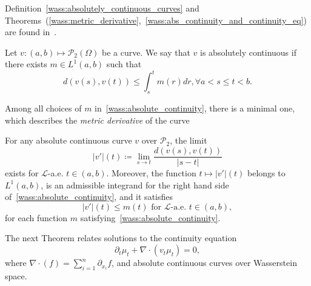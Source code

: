 Definition~\eqref{wass:absolutely_continuous_curves} 
and Theorems~(\ref{wass:metric_derivative},~\ref{wass:abs_continuity_and_continuity_eq}) are found in~\cite{ambrosio2005gradient}. 

\begin{definition}\label{wass:absolutely_continuous_curves}
    Let $v : (a,b) \mapsto \mathcal{P}_2(\Omega)$ be a curve.
    We say that $v$ is absolutely continuous if there exists
    $m \in L^1(a,b)$ such that
    \begin{equation}\label{wass:absolute_continuity}
        d(v(s), v(t)) \leq \int_s^t m(r) dr, \forall a < s \leq t < b.
    \end{equation}
\end{definition}

Among all choices of $m$ in~\eqref{wass:absolute_continuity}, there is a minimal
one, which describes the \textit{metric derivative} of the curve
\begin{theorem}\label{wass:metric_derivative}
    For any absolute continuous curve $v$ over $\mathcal{P}_2$, the limit
    \begin{equation}
        |v'|(t) \coloneqq \lim_{s \to t} \frac{d(v(s), v(t))}{|s - t|}
    \end{equation}
    exists for $\mathcal{L}$-a.e. $t \in (a,b)$. Moreover, the function
    $ t \mapsto |v'|(t) $ belongs to $L^1(a,b)$, is an admissible integrand for
    the right hand side of~\eqref{wass:absolute_continuity}, and it satisfies
    \begin{equation}
        |v'|(t) \leq m(t) \text{ for }\mathcal{L}\text{-a.e. } t \in (a,b),
    \end{equation}
    for each function $m$ satisfying~\eqref{wass:absolute_continuity}.
\end{theorem}

The next Theorem relates solutions to the continuity equation
\[\partial_t \mu_t + \nabla \cdot (v_t \mu_t) = 0,\]
where $\nabla \cdot (f) = \sum_{i = 1}^n \partial_{x_i} f$,
and absolute continuous curves over Wasserstein space. 

